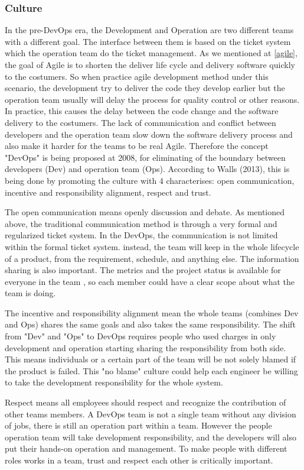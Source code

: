\subsubsection[]{Culture}
In the pre-DevOps era, the Development and Operation are two different teams with a different goal.  The interface between them is based on the ticket system which the operation team do the ticket management. As we mentioned at \ref{agile}, the goal of Agile is to shorten the deliver life cycle and delivery software quickly to the costumers. So when practice agile development method under this scenario, the development try to deliver the code they develop earlier but the operation team usually will delay the process for quality control or other reasons. In practice, this causes the delay between the code change and the software delivery to the costumers\cite{leite2019survey}. 
The lack of communication and conflict between developers and the operation team slow down the software delivery process and also make it harder for the teams to be real Agile. Therefore the concept "DevOps" is being proposed at 2008, for eliminating of the boundary between developers (Dev) and operation team (Ops). According to Walls (2013), this is being done by promoting the culture with 4 characterises: open communication, incentive and responsibility alignment, respect and trust.\cite{walls2013building}
\par 
The open communication means openly discussion and debate. As mentioned above, the traditional communication method is through a very formal and regularized ticket system. In the DevOps, the communication is not limited within the formal ticket system. instead, the team will keep in the whole lifecycle of a product, from the requirement, schedule, and anything else. \cite{walls2013building} The information sharing is also important.\cite{lwakatare2015dimensions} The metrics and the project status is available for everyone in the team \label{moniter}, so each member could have a clear scope about what the team is doing.
\par
The incentive and responsibility alignment mean the whole teams (combines Dev and Ops) shares the same goals and also takes the same responsibility. The shift from "Dev" and "Ops" to DevOps requires people who used charges in only development and operation starting sharing the responsibility from both side.\cite{lwakatare2015dimensions} This means individuals or a certain part of the team will be not solely blamed if the product is failed. This "no blame" culture could help each engineer be willing to take the development responsibility for the whole system.\cite{feitelson2013development}
\par 
Respect means all employees should respect and recognize the contribution of other teams members. A DevOps team is not a single team without any division of jobs, there is still an operation part within a team. \cite{TheresNo86:online} However the people operation team will take development responsibility, and the developers will also put their hands-on operation and management.\cite{shropshire2017uncertainty} To make people with different roles works in a team, trust and respect each other is critically important. 
